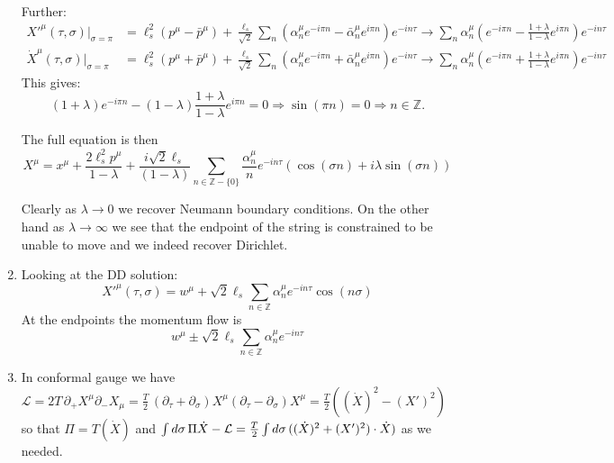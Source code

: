 \documentclass[11pt, class=article, crop=false]{standalone}
\begin{document}
\begin{enumerate}
		Further: 
		\begin{equation}
			\begin{aligned}
				{X'}^\mu(\tau, \sigma)|_{\sigma = \pi} &= \ell_s^2 (p^\mu - \bar p^\mu) + \frac{\ell_s}{\sqrt 2} \sum_{n} (\alpha_n^\mu  e^{-i \pi n}- \bar \alpha_{n}^\mu e^{i \pi n}) e^{- i n \tau} \to \sum_{n} \alpha_n^\mu  ( e^{-i \pi n}-  \frac{1+\lambda}{1-\lambda} e^{i \pi n}) e^{- i n \tau} 
				\\{\dot X}^\mu(\tau, \sigma)|_{\sigma = \pi} &=  \ell_s^2 (p^\mu + \bar p^\mu) + \frac{\ell_s}{\sqrt 2} \sum_{n} (\alpha_n^\mu e^{-i \pi n} + \bar \alpha_n^\mu e^{i \pi n}) e^{-in\tau} \to \sum_{n} \alpha_n^\mu  ( e^{-i \pi n}+  \frac{1+\lambda}{1-\lambda} e^{i \pi n}) e^{- i n \tau} 
			\end{aligned}
		\end{equation}
		This gives:
		\begin{equation}
			(1+ \lambda) e^{-i\pi n} - (1-\lambda) \frac{1+\lambda}{1-\lambda} e^{i \pi n} = 0 \Rightarrow \sin(\pi n) = 0 \Rightarrow n \in \mathbb Z.
		\end{equation}
		
		The full equation is then 
		\begin{equation}
			X^\mu = x^\mu + \frac{2\ell_s^2 p^\mu}{1-\lambda} + \frac{i \sqrt 2 \ell_s}{ (1-\lambda)} \sum_{n \in \mathbb Z - \{0\}} \frac{\alpha_n^\mu}{n} e^{-i n \tau} (\cos(\sigma n) + i \lambda \sin(\sigma n))
		\end{equation}
		
		 Clearly as $\lambda \to 0$ we recover Neumann boundary conditions. On the other hand as $\lambda \to \infty$ we see that the endpoint of the string is constrained to be unable to move and we indeed recover Dirichlet. 
		 
		 \item Looking at the DD solution:
		 \begin{equation}
		 	{X'}^\mu(\tau, \sigma) = w^\mu + \sqrt{2} \ell_s \sum_{n\in \mathbb Z} \alpha^\mu_n e^{-i n \tau} \cos(n \sigma)
		 \end{equation}
		 At the endpoints the momentum flow is 
		 \begin{equation}
		 	w^\mu \pm \sqrt2 \ell_s \sum_{n \in \mathbb Z} \alpha^\mu_n e^{-in\tau}
		 \end{equation}
		 
		 \item In conformal gauge we have $\mathcal L = 2 T\, \partial_+ X^\mu \partial_- X_\mu = \frac{T}{2}\, (\partial_\tau + \partial_\sigma) X^\mu (\partial_\tau - \partial_\sigma) X^\mu = \frac{T}{2} ((\dot X)^2 - (X')^2) $ so that $\Pi = T (\dot X)$ and $\int d\sigma\, \Pi \dot X - \mathcal{L} = \frac T2 \int d\sigma\, ((\dot X)^2 + (X')^2) \cdot \dot X)$ as we needed. 
		 

\end{enumerate}
\end{document}
